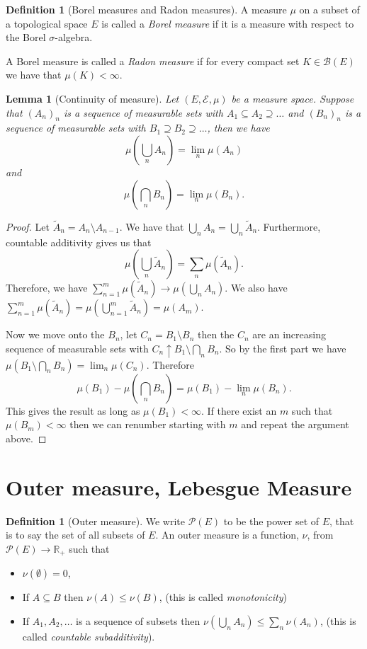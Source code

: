 \documentclass[11pt]{article}
\newtheorem{lem}[thm]{Lemma}
\theoremstyle{definition}
\newtheorem{dfn}[thm]{Definition}
\theoremstyle{remark}
\begin{document}
\begin{dfn}[Borel measures and Radon measures]
A measure $\mu$ on a subset of a topological space $E$ is called a \emph{Borel measure} if it is a measure with respect to the Borel $\sigma$-algebra.

A Borel measure is called a \emph{Radon measure} if for every compact set $K \in \mathcal{B}(E)$ we have that $\mu(K) < \infty$.
\end{dfn}

\begin{lem}[Continuity of measure]
Let $(E, \mathcal{E}, \mu)$ be a measure space. Suppose that $(A_n)_n$ is a sequence of measurable sets with $A_1 \subseteq A_2 \supseteq \dots$ and $(B_n)_n$ is a sequence of measurable sets with $B_1 \supseteq B_2 \supseteq \dots$, then we have
\[ \mu\left( \bigcup_n A_n\right) = \lim_n \mu(A_n) \] and \[ \mu\left( \bigcap_n B_n \right) = \lim_n \mu(B_n). \]
\end{lem}
\begin{proof}
Let $\tilde{A}_n = A_n \setminus A_{n-1}$. We have that $\bigcup_n A_n = \bigcup_n \tilde{A}_n$. Furthermore, countable additivity gives us that
\[ \mu\left( \bigcup_n \tilde{A}_n \right) = \sum_n \mu(\tilde{A}_n). \] Therefore, we have $\sum_{n=1}^m \mu(\tilde{A}_n) \rightarrow \mu \left( \bigcup_n A_n \right)$. We also have $\sum_{n=1}^m \mu(\tilde{A}_n) = \mu \left( \bigcup_{n=1}^m \tilde{A}_n \right) = \mu (A_m)$.

Now we move onto the $B_n$, let $C_n = B_1 \setminus B_n$ then the $C_n$ are an increasing sequence of measurable sets with $C_n \uparrow B_1 \setminus \bigcap_n B_n$. So by the first part we have $\mu\left(B_1 \setminus \bigcap_n B_n \right) = \lim_n \mu(C_n)$. Therefore
\[ \mu(B_1) - \mu\left( \bigcap_n B_n \right) = \mu(B_1) - \lim_n \mu(B_n). \] This gives the result as long as $\mu(B_1) < \infty$. If there exist an $m$ such that $\mu(B_m) < \infty$ then we can renumber starting with $m$ and repeat the argument above. 
\end{proof}




\section{Outer measure, Lebesgue Measure}

\begin{dfn}[Outer measure]
We write $\mathscr{P}(E)$ to be the power set of $E$, that is to say the set of all subsets of $E$. An outer measure is a function, $\nu$, from $\mathscr{P}(E) \rightarrow \mathbb{R}_+$ such that
\begin{itemize}
\item $\nu(\emptyset) =0$,
\item If $A \subseteq B$ then $\nu (A) \leq \nu(B)$, (this is called \emph{monotonicity})
\item If $A_1, A_2, \dots$ is a sequence of subsets then $\nu\left( \bigcup_n A_n \right) \leq \sum_n \nu(A_n)$, (this is called \emph{countable subadditivity}).
\end{itemize}
\end{dfn}
\end{document}
